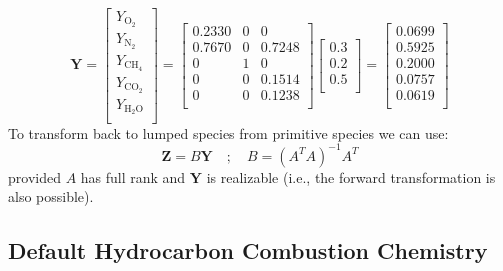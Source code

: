 \begin{equation}\label{eq:transform_to_primitive}
\mathbf{Y}=\left[\begin{array}{c}
       Y_{\mathrm{O}_2} \\
       Y_{\mathrm{N}_2} \\
       Y_{\mathrm{CH}_4} \\
       Y_{\mathrm{CO}_2} \\
       Y_{\mathrm{H}_2\mathrm{O}} \\
     \end{array}\right]
     =\left[\begin{array}{ccc}
     0.2330 & 0 & 0 \\
     0.7670 & 0 & 0.7248 \\
     0 & 1 & 0 \\
     0 & 0 & 0.1514 \\
     0 & 0 & 0.1238 \\
     \end{array}\right]
     \left[\begin{array}{c}
     0.3 \\
     0.2 \\
     0.5 \\
     \end{array}\right]
     =\left[\begin{array}{c}
     0.0699\\
     0.5925\\
     0.2000\\
     0.0757\\
     0.0619\\
     \end{array}\right]
\end{equation}
To transform back to lumped species from primitive species we can use:
\begin{equation}\label{eq:transform_back}
\textbf{Z}=B\textbf{Y} \quad ; \quad B=(A^TA)^{-1}A^T
\end{equation}
provided $A$ has full rank and $\mathbf{Y}$ is realizable (i.e., the forward transformation is also possible).

\subsection{Default Hydrocarbon Combustion Chemistry}
\label{sec:simplechemistry}

